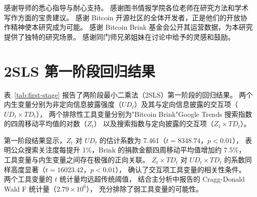 \documentclass[
    type = master, %
    degree = professional,        %
    decl-page,  %
    twoside,                %
    fontset = fandol %
  ]{njuthesis}
\begin{document}
\begin{acknowledgement}
感谢导师的悉心指导与耐心支持。
感谢图书情报学院各位老师在研究方法和学术写作方面的宝贵建议。
感谢 Bitcoin 开源社区的全体开发者，正是他们的开放协作精神使本研究成为可能。
感谢 Bitcoin Brink 基金会公开其运营数据，为本研究提供了独特的研究场景。
感谢同门师兄弟姐妹在讨论中给予的灵感和鼓励。
\end{acknowledgement}


\appendix

\chapter{2SLS 第一阶段回归结果}

表~\ref{tab:first-stage} 报告了两阶段最小二乘法（2SLS）第一阶段的回归结果。
两个内生变量分别为非定向信息披露强度（$UD_t$）及其与定向信息披露的交互项（$UD_t \times TD_t$），
两个排除性工具变量分别为"Bitcoin Brink"Google Trends 搜索指数的四周移动平均值的对数（$Z_t$）
以及搜索指数与定向披露的交互项（$Z_t \times TD_t$）。

第一阶段结果显示，$Z_t$ 对 $UD_t$ 的估计系数为 7.461（$t = 8348.74$，$p < 0.01$），
表明公众搜索关注度每提升 1\%，Brink 的捐款金额四周移动平均值增加约 7.5\%，
工具变量与内生变量之间存在极强的正向关联。
$Z_t \times TD_t$ 对 $UD_t \times TD_t$ 的系数同样高度显著（$t = 16023.42$，$p < 0.01$），
确认了交互项工具变量的相关性条件。
两个工具变量的 $t$ 统计量均远超传统阈值，
结合主分析中报告的 Cragg-Donald Wald F 统计量（$2.79 \times 10^6$），
充分排除了弱工具变量的可能性。
\end{document}
